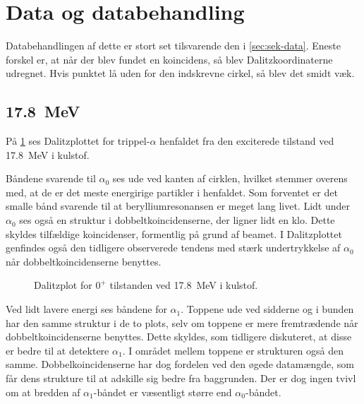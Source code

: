 \section{Data og databehandling}
\label{sec:dalitz-data}

Databehandlingen af dette er stort set tilsvarende den i \cref{sec:sek-data}. Eneste forskel er, at når
der blev fundet en koincidens, så blev Dalitzkoordinaterne udregnet. Hvis punktet lå uden for den
indskrevne cirkel, så blev det smidt væk.

\subsection{\SI{17.8}{\MeV}}
\label{sec:dalitz-178}


På \cref{fig:dalitz-1077} ses Dalitzplottet for trippel-$\alpha$ henfaldet fra den exciterede tilstand
ved \SI{17.8}{\MeV} i kulstof. %

Båndene svarende til $\alpha_{0}$ ses ude ved kanten af cirklen, hvilket stemmer overens med, at de er
det meste energirige partikler i henfaldet. Som forventet er det smalle bånd svarende til at
berylliumresonansen er meget lang livet. Lidt under $\alpha_{0}$ ses også en struktur i dobbeltkoincidenserne,
der ligner lidt en klo. Dette skyldes tilfældige koincidenser, formentlig på grund af beamet. I
Dalitzplottet genfindes også den tidligere observerede tendens med stærk undertrykkelse af $\alpha_{0}$
når dobbeltkoincidenserne benyttes. 

\begin{figure}[t]
  \centering
  \hfill
  \caption{Dalitzplot for $0^{+}$ tilstanden ved \SI{17.8}{\MeV} i kulstof.}
  \label{fig:dalitz-1077}
\end{figure}

Ved lidt lavere energi ses båndene for $\alpha_{1}$. Toppene ude ved sidderne og i bunden har den samme
struktur i de to plots, selv om toppene er mere fremtrædende når dobbeltkoincidenserne
benyttes. Dette skyldes, som tidligere diskuteret, at disse er bedre til at detektere $\alpha_{1}$. I
området mellem toppene er strukturen også den samme. Dobbelkoincidenserne har dog fordelen ved den
øgede datamængde, som får dens strukture til at adskille sig bedre fra baggrunden. Der er dog ingen
tvivl om at bredden af $\alpha_{1}$-båndet er væsentligt større end $\alpha_{0}$-båndet. 

